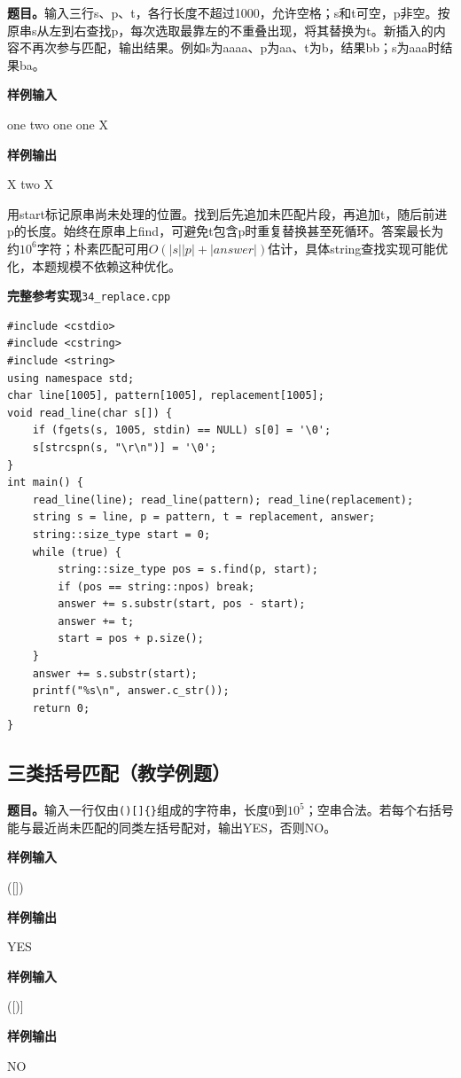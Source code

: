 \documentclass[UTF8,11pt,a4paper,fontset=none]{ctexart}
\begin{document}
\noindent\textbf{题目。}输入三行s、p、t，各行长度不超过1000，允许空格；s和t可空，p非空。按原串s从左到右查找p，每次选取最靠左的不重叠出现，将其替换为t。新插入的内容不再次参与匹配，输出结果。例如s为aaaa、p为aa、t为b，结果bb；s为aaa时结果ba。
\begin{tcolorbox}[samplebox,title={输入输出样例}]
\textbf{样例输入}
\begin{Sample}
one two one
one
X
\end{Sample}
\tcblower
\textbf{样例输出}
\begin{Sample}
X two X
\end{Sample}
\end{tcolorbox}
用start标记原串尚未处理的位置。找到后先追加未匹配片段，再追加t，随后前进p的长度。始终在原串上find，可避免t包含p时重复替换甚至死循环。答案最长为约$10^6$字符；朴素匹配可用$O(|s||p|+|answer|)$估计，具体string查找实现可能优化，本题规模不依赖这种优化。
\par\noindent\begin{minipage}{\linewidth}
\textbf{完整参考实现}\quad\texttt{34\_replace.cpp}
\begin{lstlisting}
#include <cstdio>
#include <cstring>
#include <string>
using namespace std;
char line[1005], pattern[1005], replacement[1005];
void read_line(char s[]) {
    if (fgets(s, 1005, stdin) == NULL) s[0] = '\0';
    s[strcspn(s, "\r\n")] = '\0';
}
int main() {
    read_line(line); read_line(pattern); read_line(replacement);
    string s = line, p = pattern, t = replacement, answer;
    string::size_type start = 0;
    while (true) {
        string::size_type pos = s.find(p, start);
        if (pos == string::npos) break;
        answer += s.substr(start, pos - start);
        answer += t;
        start = pos + p.size();
    }
    answer += s.substr(start);
    printf("%s\n", answer.c_str());
    return 0;
}
\end{lstlisting}
\end{minipage}\par

\subsection{三类括号匹配（教学例题）}

\noindent\textbf{题目。}输入一行仅由\texttt{()[]\{\}}组成的字符串，长度0到$10^5$；空串合法。若每个右括号能与最近尚未匹配的同类左括号配对，输出YES，否则NO。
\begin{tcolorbox}[samplebox,title={输入输出样例 1}]
\textbf{样例输入}
\begin{Sample}
([]){}
\end{Sample}
\tcblower
\textbf{样例输出}
\begin{Sample}
YES
\end{Sample}
\end{tcolorbox}
\begin{tcolorbox}[samplebox,title={输入输出样例 2}]
\textbf{样例输入}
\begin{Sample}
([)]
\end{Sample}
\tcblower
\textbf{样例输出}
\begin{Sample}
NO
\end{Sample}
\end{tcolorbox}
\end{document}
